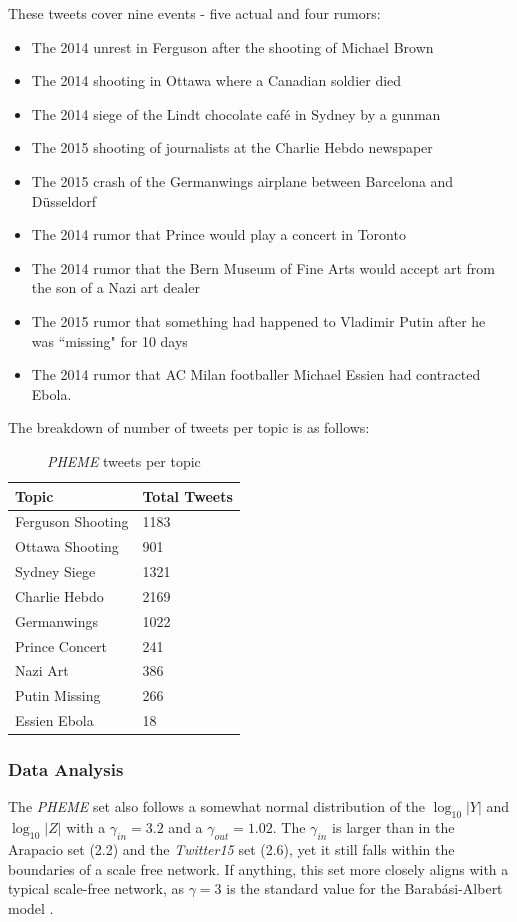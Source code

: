 \documentclass[preprint,review,12pt]{elsarticle}
\begin{document}
These tweets cover nine events - five actual and four rumors:
\begin{itemize}
    \item The 2014 unrest in Ferguson after the shooting of Michael Brown
    \item The 2014 shooting in Ottawa where a Canadian soldier died
    \item The 2014 siege of the Lindt chocolate caf{\'e} in Sydney by a gunman 
    \item The 2015 shooting of journalists at the Charlie Hebdo newspaper
    \item The 2015 crash of the Germanwings airplane between Barcelona and D\"{u}sseldorf
    \item The 2014 rumor that Prince would play a concert in Toronto
    \item The 2014 rumor that the Bern Museum of Fine Arts would accept art from the son of a Nazi art dealer
    \item The 2015 rumor that something had happened to Vladimir Putin after he was ``missing" for 10 days
    \item The 2014 rumor that AC Milan footballer Michael Essien had contracted Ebola.
\end{itemize}
The breakdown of number of tweets per topic is as follows:
\begin{table}[h]
    \centering
    \begin{tabular}{|p{4cm}|p{3cm}|}
    \hline
    Topic & Total Tweets \\
    \hline
         Ferguson Shooting & 1183 \\
         Ottawa Shooting & 901 \\
         Sydney Siege & 1321 \\
         Charlie Hebdo & 2169 \\
         Germanwings & 1022 \\
         Prince Concert & 241 \\
         Nazi Art & 386 \\
         Putin Missing & 266 \\
         Essien Ebola & 18 \\
    \hline
    \end{tabular}
    \caption{\textit{PHEME} tweets per topic}
    \label{tab:pheme tweets per topic}
\end{table}

\subsubsection{Data Analysis}
The \textit{PHEME} set also follows a somewhat normal distribution of the $\log_{10}|Y|$ and $\log_{10}|Z|$ with a $\gamma_{in} = 3.2$ and a $\gamma_{out} = 1.02$. The $\gamma_{in}$ is larger than in the Arapacio set (2.2) and the \textit{Twitter15} set (2.6), yet it still falls within the boundaries of a scale free network. If anything, this set more closely aligns with a typical scale-free network, as $\gamma = 3$ is the standard value for the Barab{\'a}si-Albert model \cite{barabasi1999emergence,barabasi2000scale,pastor2001epidemic}.
\end{document}
